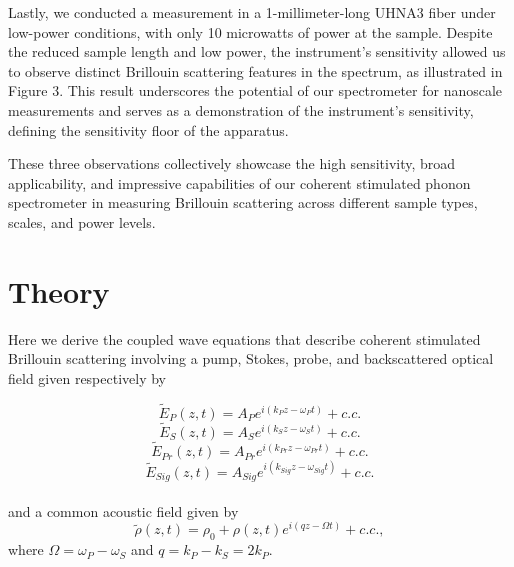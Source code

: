 \documentclass[sn-nature]{sn-jnl}%
\begin{document}
Lastly, we conducted a measurement in a 1-millimeter-long UHNA3 fiber under low-power conditions, with only 10 microwatts of power at the sample. Despite the reduced sample length and low power, the instrument's sensitivity allowed us to observe distinct Brillouin scattering features in the spectrum, as illustrated in Figure 3. This result underscores the potential of our spectrometer for nanoscale measurements and serves as a demonstration of the instrument's sensitivity, defining the sensitivity floor of the apparatus.

These three observations collectively showcase the high sensitivity, broad applicability, and impressive capabilities of our coherent stimulated phonon spectrometer in measuring Brillouin scattering across different sample types, scales, and power levels.

\section{Theory}\label{Theory}

Here we derive the coupled wave equations that describe coherent stimulated Brillouin scattering involving a pump, Stokes, probe, and backscattered optical field given respectively by

\begin{equation}
    \tilde{E}_{P}(z,t) = A_{P}e^{i(k_{P}z - \omega_{P}t)} + c.c.
    \label{Pump optical field}
\end{equation}
\begin{equation}
    \tilde{E}_{S}(z,t) = A_{S}e^{i(k_{S}z - \omega_{S}t)} + c.c.
    \label{Stokes optical field}
\end{equation}
\begin{equation}
    \tilde{E}_{Pr}(z,t) = A_{Pr}e^{i(k_{Pr}z - \omega_{Pr}t)} + c.c.
    \label{Probe optical field}
\end{equation}
\begin{equation}
    \tilde{E}_{Sig}(z,t) = A_{Sig}e^{i(k_{Sig}z - \omega_{Sig}t)} + c.c.
    \label{Signal optical field}
\end{equation}
\\
\noindent and a common acoustic field given by
\begin{equation}
    \tilde{\rho}(z,t) = \rho_{0} + \rho(z,t)e^{i(qz - \Omega t)} + c.c.,
    \label{acoustic field}
\end{equation}
\noindent where $\Omega = \omega_{P} - \omega_{S}$ and $q = k_{P} - k_{S} = 2k_{P}$.
\end{document}
